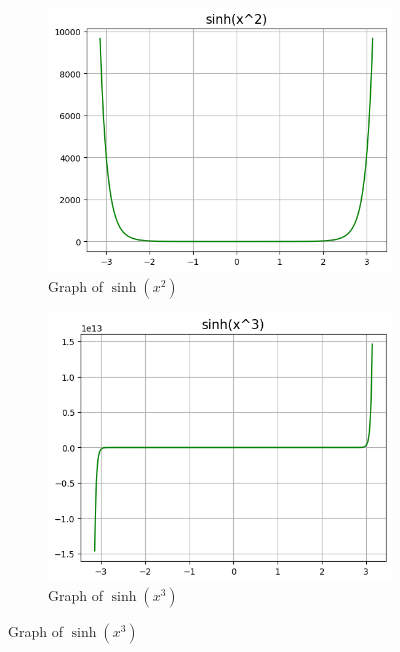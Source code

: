 \documentclass{article}
\begin{document}
\begin{figure}[h!]
\begin{subfigure}[t]{0.3\textwidth}
            \label{fig:sinh-x1}
        \end{subfigure}
        \hfill
        \begin{subfigure}[t]{0.3\textwidth}
            \includegraphics[width=\textwidth]{params/sinh-x2.png}
            \caption{Graph of $\sinh(x^2)$}
            \label{fig:sinh-x2}
        \end{subfigure}       
        \hfill
        \begin{subfigure}[t]{0.3\textwidth}
            \includegraphics[width=\textwidth]{params/sinh-x3.png}
            \caption{Graph of $\sinh(x^3)$}
            \label{fig:sinh-x3}
        \end{subfigure}

\end{figure}
\end{document}
